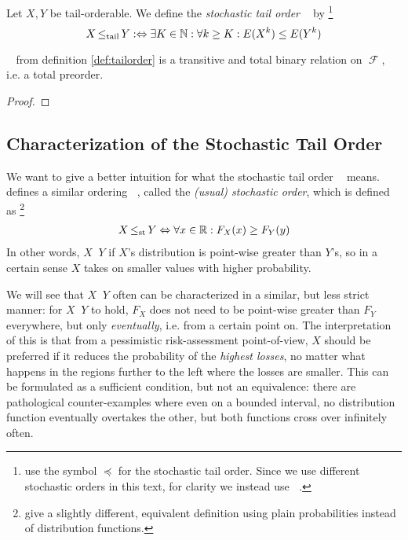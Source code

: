 \documentclass[a4paper]{scrreprt}
\DeclareMathOperator{\leqst}{\leq_{\text{st}}}
\DeclareMathOperator{\leqtail}{\leq_{\text{tail}}}
\DeclareMathOperator{\F}{\mathcal{F}}
\begin{document}
    \begin{defn}
        Let $X, Y$ be tail-orderable. We define the \emph{stochastic tail order} $\leqtail$ by
        \footnote{\cite{bib:rassTotalOrderingOnLossDistributions,bib:rassGameRiskManagI} use the symbol $\preceq$ for the stochastic tail order. Since we use different stochastic orders in this text, for clarity we instead use $\leqtail$.}
        \[ X \leqtail Y :\lra \exists K \in \N: \forall k \geq K: E(X^k) \leq E(Y^k)\]
        \label{def:tailorder}
    \end{defn}
    
    \begin{lemma}
        $\leqtail$ from definition \ref{def:tailorder} is a transitive and total binary relation on $\F$, i.e. a total preorder.
    \end{lemma}
    \begin{proof}
    \end{proof}
    
    \subsection{Characterization of the Stochastic Tail Order}
    We want to give a better intuition for what the stochastic tail order $\leqtail$ means.
    \cite{bib:shakedStochasticOrders} defines a similar ordering $\leqst$, called the \emph{(usual) stochastic order}, which is defined as
    \footnote{\cite{bib:shakedStochasticOrders} give a slightly different, equivalent definition using plain probabilities instead of distribution functions.}
    \begin{gather}
        X \leqst Y \lra \forall x \in \R: F_X(x) \geq F_Y(y)
    \end{gather}
    In other words, $X \leqst Y$ if $X$'s distribution is point-wise greater than $Y$'s, so in a certain sense $X$ takes on smaller values with higher probability.
    
    We will see that $X \leqtail Y$ often can be characterized in a similar, but less strict manner: for $X \leqst Y$ to hold, $F_X$ does not need to be point-wise greater than $F_Y$ everywhere, but only \emph{eventually}, i.e. from a certain point on. The interpretation of this is that from a pessimistic risk-assessment point-of-view, $X$ should be preferred if it reduces the probability of the \emph{highest losses}, no matter what happens in the regions further to the left where the losses are smaller. This can be formulated as a sufficient condition, but not an equivalence: there are pathological counter-examples where even on a bounded interval, no distribution function eventually overtakes the other, but both functions cross over infinitely often.
    
\end{document}
